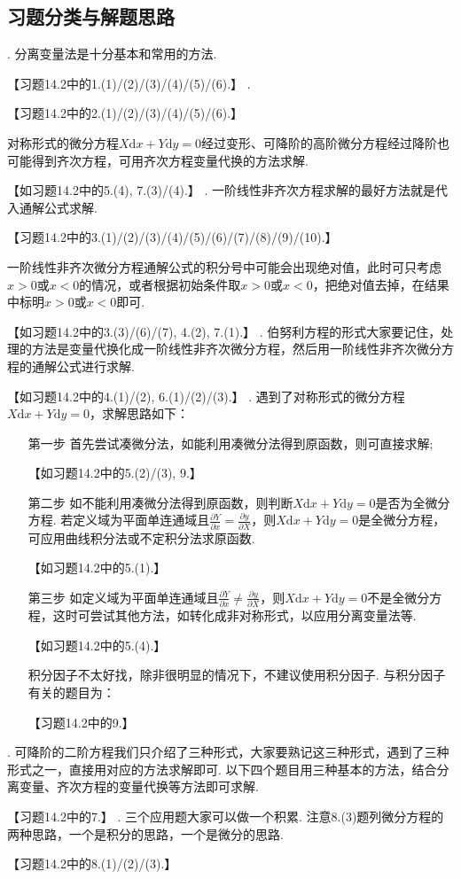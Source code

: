 \documentclass[12pt,UTF8]{ctexart}
\newcommand{\md}[1]{\mathrm d#1}
\newcommand{\pp}[2]{\frac{\partial #1}{\partial #2}}
\newcommand{\ppx}[1]{\frac{\partial #1}{\partial x}}
\begin{document}
\subsection{习题分类与解题思路}
\begin{enumerate}
. 分离变量法是十分基本和常用的方法.

【习题14.2中的1.(1)/(2)/(3)/(4)/(5)/(6).】
.

【习题14.2中的2.(1)/(2)/(3)/(4)/(5)/(6).】

对称形式的微分方程$X\md x+Y\md y=0$经过变形、可降阶的高阶微分方程经过降阶也可能得到齐次方程，可用齐次方程变量代换的方法求解.

【如习题14.2中的5.(4), 7.(3)/(4).】
. 一阶线性非齐次方程求解的最好方法就是代入通解公式求解.

【习题14.2中的3.(1)/(2)/(3)/(4)/(5)/(6)/(7)/(8)/(9)/(10).】

一阶线性非齐次微分方程通解公式的积分号中可能会出现绝对值，此时可只考虑$x>0$或$x<0$的情况，或者根据初始条件取$x>0$或$x<0$，把绝对值去掉，在结果中标明$x>0$或$x<0$即可.

【如习题14.2中的3.(3)/(6)/(7), 4.(2), 7.(1).】
. 伯努利方程的形式大家要记住，处理的方法是变量代换化成一阶线性非齐次微分方程，然后用一阶线性非齐次微分方程的通解公式进行求解.

【如习题14.2中的4.(1)/(2), 6.(1)/(2)/(3).】
. 遇到了对称形式的微分方程$X\md x+Y\md y=0$，求解思路如下：
\begin{enumerate}
\item[第一步]首先尝试凑微分法，如能利用凑微分法得到原函数，则可直接求解;

【如习题14.2中的5.(2)/(3), 9.】
\item[第二步]如不能利用凑微分法得到原函数，则判断$X\md x+Y\md y=0$是否为全微分方程. 若定义域为平面单连通域且$\ppx Y=\pp yX$，则$X\md x+Y\md y=0$是全微分方程，可应用曲线积分法或不定积分法求原函数.

【如习题14.2中的5.(1).】
\item[第三步]如定义域为平面单连通域且$\ppx Y\neq\pp yX$，则$X\md x+Y\md y=0$不是全微分方程，这时可尝试其他方法，如转化成非对称形式，以应用分离变量法等.

【如习题14.2中的5.(4).】

积分因子不太好找，除非很明显的情况下，不建议使用积分因子. 与积分因子有关的题目为：

【习题14.2中的9.】
\end{enumerate}
. 可降阶的二阶方程我们只介绍了三种形式，大家要熟记这三种形式，遇到了三种形式之一，直接用对应的方法求解即可. 以下四个题目用三种基本的方法，结合分离变量、齐次方程的变量代换等方法即可求解.

【习题14.2中的7.】
. 三个应用题大家可以做一个积累. 注意8.(3)题列微分方程的两种思路，一个是积分的思路，一个是微分的思路.

【习题14.2中的8.(1)/(2)/(3).】
\end{enumerate}
\end{document}
